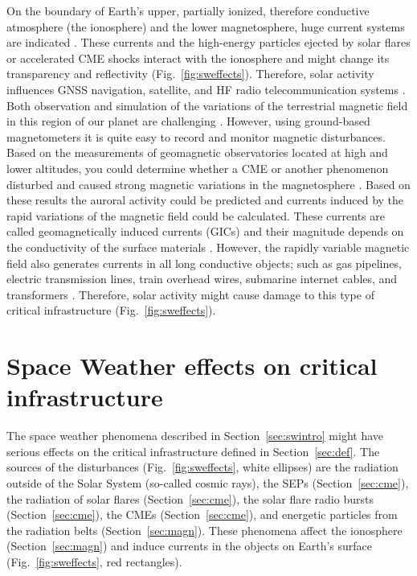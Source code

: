 \documentclass[sn-aps]{sn-jnl}%
\begin{document}
On the boundary of Earth's upper, partially ionized, therefore conductive atmosphere (the ionosphere) and the lower magnetosphere, huge current systems are indicated \cite{juusola14:_statis_gumic_mhd}. These currents and the high-energy particles ejected by solar flares or accelerated CME shocks interact with the ionosphere and might change its transparency and reflectivity (Fig.~\ref{fig:sweffects}). Therefore, solar activity influences GNSS navigation, satellite, and HF radio telecommunication systems \cite{scherer05:_space_weath}. Both observation and simulation of the variations of the terrestrial magnetic field in this region of our planet are challenging \cite{facsko16:_one_earth}. However, using ground-based magnetometers it is quite easy to record and monitor magnetic disturbances. Based on the measurements of geomagnetic observatories located at high and lower altitudes, you could determine whether a CME or another phenomenon disturbed and caused strong magnetic variations in the magnetosphere \cite{scherer05:_space_weath}. Based on these results the auroral activity could be predicted and currents induced by the rapid variations of the magnetic field could be calculated. These currents are called geomagnetically induced currents (GICs) and their magnitude depends on the conductivity of the surface materials \cite{scherer05:_space_weath}. However, the rapidly variable magnetic field also generates currents in all long conductive objects; such as gas pipelines, electric transmission lines, train overhead wires, submarine internet cables, and transformers \cite{scherer05:_space_weath}. Therefore, solar activity might cause damage to this type of critical infrastructure (Fig.~\ref{fig:sweffects}).

\section{Space Weather effects on critical infrastructure}
\label{sec:sweci}

The space weather phenomena described in Section~\ref{sec:swintro} might have serious effects on the critical infrastructure defined in Section~\ref{sec:def}. The sources of the disturbances (Fig.~\ref{fig:sweffects}, white ellipses) are the radiation outside of the Solar System (so-called cosmic rays), the SEPs (Section~\ref{sec:cme}), the radiation of solar flares (Section~\ref{sec:cme}), the solar flare radio bursts (Section~\ref{sec:cme}), the CMEs (Section~\ref{sec:cme}), and energetic particles from the radiation belts (Section~\ref{sec:magn}). These phenomena affect the ionosphere (Section~\ref{sec:magn}) and induce currents in the objects on Earth's surface (Fig.~\ref{fig:sweffects}, red rectangles). 
\end{document}
